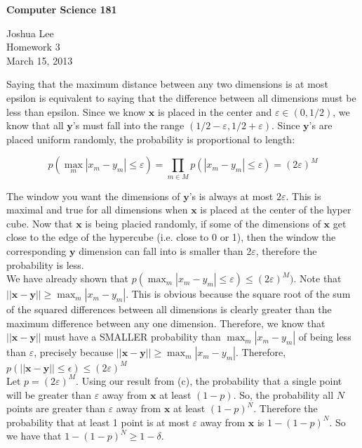 \documentclass[12pt]{article}
\newcommand{\bs}{\boldsymbol}
\begin{document}
\begin{center}
\large
\textbf{Computer Science 181} \\
\medskip

Joshua Lee\\
Homework 3\\
March 15, 2013\end{center}

Saying that the maximum distance between any two dimensions is at most epsilon is equivalent to saying that the difference between all dimensions must be less than epsilon. Since we know $\boldsymbol{x}$ is placed in the center and $\varepsilon\in(0, 1/2)$, we know that all $\boldsymbol{y}$'s must fall into the range $(1/2-\varepsilon, 1/2+\varepsilon)$. Since $\boldsymbol{y}$'s are placed uniform randomly, the probability is proportional to length:

$$
p(\max_m|x_m-y_m|\le\varepsilon) = \prod_{m \in M} p(|x_m-y_m| \le \varepsilon) = (2\varepsilon)^M
$$

The window you want the dimensions of $\boldsymbol{y}$'s is always at most $2\varepsilon$. This is maximal and true for all dimensions when $\boldsymbol{x}$ is placed at the center of the hyper cube. Now that $\boldsymbol{x}$ is being placied randomly, if some of the dimensions of $\boldsymbol{x}$ get close to the edge of the hypercube (i.e. close to 0 or 1), then the window the corresponding $\boldsymbol{y}$ dimension can fall into is smaller than $2\varepsilon$, therefore the probability is less. \\


We have already shown that $p(\max_m|x_m-y_m|\le\varepsilon) \le (2\varepsilon)^M)$. Note that $||\bs{x}-\bs{y}|| \ge \max_m|x_m-y_m|$. This is obvious because the square root of the sum of the squared differences between all dimensions is clearly greater than the maximum difference between any one dimension. Therefore, we know that $||\bs{x}-\bs{y}||$ must have a SMALLER probability than $\max_m|x_m-y_m|$ of being less than $\varepsilon$, precisely because $||\bs{x}-\bs{y}|| \ge \max_m|x_m-y_m|$. Therefore, $p(||\bs{x}-\bs{y}|| \le \epsilon) \le (2\varepsilon)^M$ \\

Let $p = (2\varepsilon)^M$. Using our result from (c), the probability that a single point will be greater than $\varepsilon$ away from $\bs{x}$ at least $(1-p)$. So, the probability all $N$ points are greater than $\varepsilon$ away from $\bs{x}$ at least $(1-p)^N$. Therefore the probability that at least 1 point is at most $\varepsilon$ away from $\bs{x}$ is $1 - (1-p)^N$. So we have that $1 - (1-p)^N \ge 1-\delta$. \\
\end{document}
